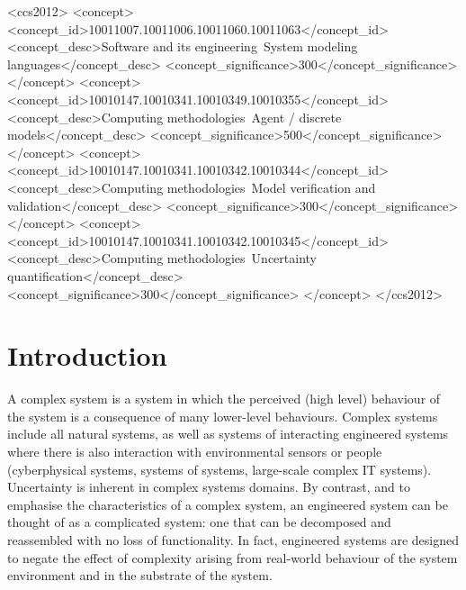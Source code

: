 \documentclass[sigconf,authordraft]{acmart}
\begin{document}
\begin{CCSXML}
<ccs2012>
<concept>
<concept_id>10011007.10011006.10011060.10011063</concept_id>
<concept_desc>Software and its engineering~System modeling languages</concept_desc>
<concept_significance>300</concept_significance>
</concept>
<concept>
<concept_id>10010147.10010341.10010349.10010355</concept_id>
<concept_desc>Computing methodologies~Agent / discrete models</concept_desc>
<concept_significance>500</concept_significance>
</concept>
<concept>
<concept_id>10010147.10010341.10010342.10010344</concept_id>
<concept_desc>Computing methodologies~Model verification and validation</concept_desc>
<concept_significance>300</concept_significance>
</concept>
<concept>
<concept_id>10010147.10010341.10010342.10010345</concept_id>
<concept_desc>Computing methodologies~Uncertainty quantification</concept_desc>
<concept_significance>300</concept_significance>
</concept>
</ccs2012>
\end{CCSXML}



\maketitle

\section{Introduction}

A complex system is a system in which the perceived (high level) behaviour of the system is a consequence of many lower-level behaviours.  Complex systems include all natural systems, as well as systems of interacting engineered systems where there is also interaction with environmental sensors or people (cyberphysical systems, systems of systems, large-scale complex IT systems).  Uncertainty is inherent in complex systems domains. 
By contrast, and to emphasise the characteristics of a complex system, an engineered system can be thought of as a complicated system: one that can be decomposed and reassembled with no loss of functionality.  In fact, engineered systems are designed to negate the effect of complexity arising from real-world behaviour of the system environment and in the substrate of the system.
\end{document}
